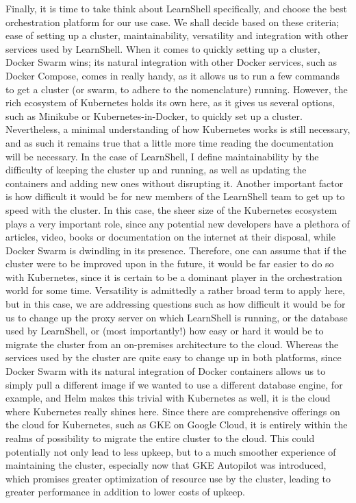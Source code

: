 \documentclass[thesis=B,english]{FITthesis}[2019/12/23]
\begin{document}
Finally, it is time to take think about LearnShell specifically, and choose the best orchestration platform for our use case. We shall decide based on these criteria; ease of setting up a cluster, maintainability, versatility and integration with other services used by LearnShell.
\newline
When it comes to quickly setting up a cluster, Docker Swarm wins; its natural integration with other Docker services, such as Docker Compose, comes in really handy, as it allows us to run a few commands to get a cluster (or swarm, to adhere to the nomenclature) running. However, the rich ecosystem of Kubernetes holds its own here, as it gives us several options, such as Minikube or Kubernetes-in-Docker, to quickly set up a cluster. Nevertheless, a minimal understanding of how Kubernetes works is still necessary, and as such it remains true that a little more time reading the documentation will be necessary.
\newline
In the case of LearnShell, I define maintainability by the difficulty of keeping the cluster up and running, as well as updating the containers and adding new ones without disrupting it. Another important factor is how difficult it would be for new members of the LearnShell team to get up to speed with the cluster. In this case, the sheer size of the Kubernetes ecosystem plays a very important role, since any potential new developers have a plethora of articles, video, books or documentation on the internet at their disposal, while Docker Swarm is dwindling in its presence. Therefore, one can assume that if the cluster were to be improved upon in the future, it would be far easier to do so with Kubernetes, since it is certain to be a dominant player in the orchestration world for some time.
\newline
Versatility is admittedly a rather broad term to apply here, but in this case, we are addressing questions such as how difficult it would be for us to change up the proxy server on which LearnShell is running, or the database used by LearnShell, or (most importantly!) how easy or hard it would be to migrate the cluster from an on-premises architecture to the cloud. Whereas the services used by the cluster are quite easy to change up in both platforms, since Docker Swarm with its natural integration of Docker containers allows us to simply pull a different image if we wanted to use a different database engine, for example, and Helm makes this trivial with Kubernetes as well, it is the cloud where Kubernetes really shines here. Since there are comprehensive offerings on the cloud for Kubernetes, such as GKE on Google Cloud, it is entirely within the realms of possibility to migrate the entire cluster to the cloud. This could potentially not only lead to less upkeep, but to a much smoother experience of maintaining the cluster, especially now that GKE Autopilot was introduced, which promises greater optimization of resource use by the cluster, leading to greater performance in addition to lower costs of upkeep. \cite{autopilot}
\end{document}
